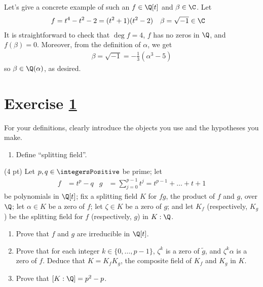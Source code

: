 {Let's give a concrete example of such an $f \in \Q[t]$ and $\beta \in \C$. Let
\begin{align*}
f
&=
t^{4} - t^{2} - 2
=
(t^{2} + 1) (t^{2} - 2)
&
\beta
&=
\sqrt{-1}
\in
\C
\end{align*}
It is straightforward to check that $\deg f = 4$, $f$ has no zeros in $\Q$, and $f(\beta) = 0$. Moreover, from the definition of $\alpha$, we get
\begin{align*}
\beta
=
\sqrt{-1}
=
-\frac{1}{3} (\alpha^{3} - 5)
\end{align*}
so $\beta \in \Q(\alpha)$, as desired.}%


\section{Exercise \ref{sec : e02q3}}
\label{sec : e02q3}

\noindent{}For your definitions, clearly introduce the objects you use and the hypotheses you make.
\begin{enumerate}[label=(\alph*)]
\item\label{itm : e02q3a} Define ``splitting field''.
\end{enumerate}
(4 pt) Let $p, q \in \integersPositive$ be prime; let
\begin{align*}
f
&=
t^{p} - q
&
g
&=
\sum_{j = 0}^{p - 1} t^{j}
=
t^{p - 1} + \ldots + t + 1
\end{align*}
be polynomials in $\Q[t]$; fix a splitting field $K$ for $f g$, the product of $f$ and $g$, over $\Q$; let $\alpha \in K$ be a zero of $f$; let $\zeta \in K$ be a zero of $g$; and let $K_{f}$ (respectively, $K_{g}$) be the splitting field for $f$ (respectively, $g$) in $K : \Q$.
\begin{enumerate}[resume, label=(\alph*)]
\item\label{itm : e02q3b} Prove that $f$ and $g$ are irreducible in $\Q[t]$. 
\item\label{itm : e02q3c} Prove that for each integer $k \in \{0, \ldots, p - 1\}$, $\zeta^{k}$ is a zero of $\tilde{g}$, and $\zeta^{k} \alpha$ is a zero of $f$. Deduce that $K = K_{f} K_{g}$, the composite field of $K_{f}$ and $K_{g}$ in $K$.
\item\label{itm : e02q3d} Prove that $[K : \Q] = p^{2} - p$. 
\end{enumerate}

